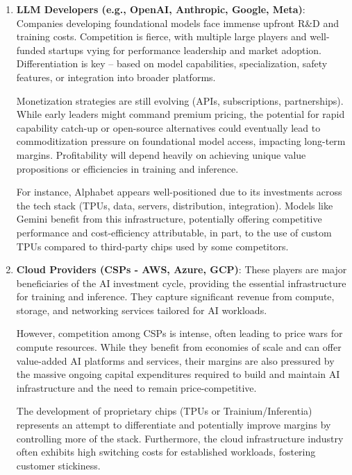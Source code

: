 \begin{enumerate}
    \item \textbf{LLM Developers (e.g., OpenAI, Anthropic, Google, Meta)}: Companies developing foundational models face immense upfront R\&D and training costs. Competition is fierce, with multiple large players and well-funded startups vying for performance leadership and market adoption. Differentiation is key – based on model capabilities, specialization, safety features, or integration into broader platforms.

          Monetization strategies are still evolving (APIs, subscriptions, partnerships). While early leaders might command premium pricing, the potential for rapid capability catch-up or open-source alternatives could eventually lead to commoditization pressure on foundational model access, impacting long-term margins. Profitability will depend heavily on achieving unique value propositions or efficiencies in training and inference.

          For instance, Alphabet appears well-positioned due to its investments across the tech stack (TPUs, data, servers, distribution, integration). Models like Gemini benefit from this infrastructure, potentially offering competitive performance and cost-efficiency attributable, in part, to the use of custom TPUs compared to third-party chips used by some competitors.

    \item \textbf{Cloud Providers (CSPs - AWS, Azure, GCP)}: These players are major beneficiaries of the AI investment cycle, providing the essential infrastructure for training and inference. They capture significant revenue from compute, storage, and networking services tailored for AI workloads.

          However, competition among CSPs is intense, often leading to price wars for compute resources. While they benefit from economies of scale and can offer value-added AI platforms and services, their margins are also pressured by the massive ongoing capital expenditures required to build and maintain AI infrastructure and the need to remain price-competitive.

          The development of proprietary chips (TPUs or Trainium/Inferentia) represents an attempt to differentiate and potentially improve margins by controlling more of the stack. Furthermore, the cloud infrastructure industry often exhibits high switching costs for established workloads, fostering customer stickiness.


\end{enumerate}
